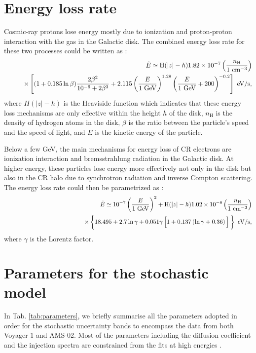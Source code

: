 \section*{Energy loss rate}

Cosmic-ray protons lose energy mostly due to ionization and proton-proton interaction with the gas in the Galactic disk. The combined energy loss rate for these two processes could be written as \cite{schlickeiser2002,krakau2015}: 
\begin{eqnarray}
&&\dot{E}\simeq \textrm{H}(|z|-h) 1.82\times 10^{-7}\left(\frac{n_{\textrm{H}}}{1\textrm{ cm}^{-3}}\right)\nonumber\\
&&\qquad\times\left[(1+0.185\ln\beta)\frac{2\beta^2}{10^{-6}+2\beta^3}+2.115\left(\frac{E}{1\textrm{ GeV}}\right)^{1.28}\left(\frac{E}{1\textrm{ GeV}}+200\right)^{-0.2}\right]\textrm{ eV/s},
\end{eqnarray}
where $H(|z|-h)$ is the Heaviside function which indicates that these energy loss mechanisms are only effective within the height $h$ of the disk, $n_{\mathrm{H}}$ is the density of hydrogen atoms in the disk, $\beta$ is the ratio between the particle's speed and the speed of light, and $E$ is the kinetic energy of the particle.  

Below a few GeV, the main mechanisms for energy loss of CR electrons are ionization interaction and bremsstrahlung radiation in the Galactic disk. At higher energy, these particles lose energy more effectively not only in the disk but also in the CR halo due to synchrotron radiation and inverse Compton scattering. The energy loss rate could then be parametrized as \cite{schlickeiser2002,mertsch2011,evoli2017}:  
\begin{eqnarray}
&&\dot{E}\simeq 10^{-7}\left(\frac{E}{1\textrm{ GeV}}\right)^2+\textrm{H}(|z|-h) 1.02\times 10^{-8}\left(\frac{n_\mathrm{H}}{1\textrm{ cm}^{-3}}\right)\n\\
&&\qquad\qquad\qquad\qquad\qquad\qquad\times\left\{18.495+2.7\ln\gamma+0.051\gamma\left[1+0.137\left(\ln\gamma+0.36\right)\vphantom{^{\frac{^\frac{}{}}{}}}\right]\vphantom{^{\dfrac{}{}}}\right\}\textrm{ eV/s},
\end{eqnarray}
where $\gamma$ is the Lorentz factor.

\section*{Parameters for the stochastic model}
In Tab. \ref{tab:parameters}, we briefly summarise all the parameters adopted in order for the stochastic uncertainty bands to encompass the data from both Voyager 1 and AMS-02. Most of the parameters including the diffusion coefficient and the injection spectra are constrained from the fits at high energies \cite{evoli2019}. 

